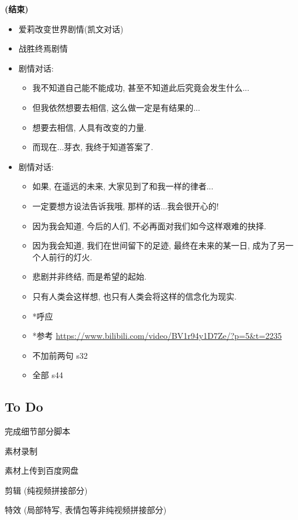 \documentclass[a4paper]{article}
\begin{document}
\textbf{(结束)}

\begin{itemize}
    \item 爱莉改变世界剧情(凯文对话)
    \item 战胜终焉剧情
    \item 剧情对话:
    \begin{itemize}
        \item 我不知道自己能不能成功, 甚至不知道此后究竟会发生什么...
        \item 但我依然想要去相信, 这么做一定是有结果的...
        \item 想要去相信, 人具有改变的力量.
        \item 而现在...芽衣, 我终于知道答案了.
    \end{itemize}
    \item 剧情对话:
    \begin{itemize}
        \item 如果, 在遥远的未来, 大家见到了和我一样的律者...
        \item 一定要想方设法告诉我哦, 那样的话...我会很开心的!
        \item 因为我会知道, 今后的人们, 不必再面对我们如今这样艰难的抉择.
        \item 因为我会知道, 我们在世间留下的足迹, 最终在未来的某一日, 成为了另一个人前行的灯火.
        \item 悲剧并非终结, 而是希望的起始.
        \item 只有人类会这样想, 也只有人类会将这样的信念化为现实.
        \item *呼应
        \item *参考 \url{https://www.bilibili.com/video/BV1r94y1D7Ze/?p=5&t=2235}
        \item 不加前两句 s32
        \item 全部 s44
    \end{itemize}
\end{itemize}

\subsection{To Do}

完成细节部分脚本

素材录制

素材上传到百度网盘

剪辑 (纯视频拼接部分)

特效 (局部特写, 表情包等非纯视频拼接部分)
\end{document}
